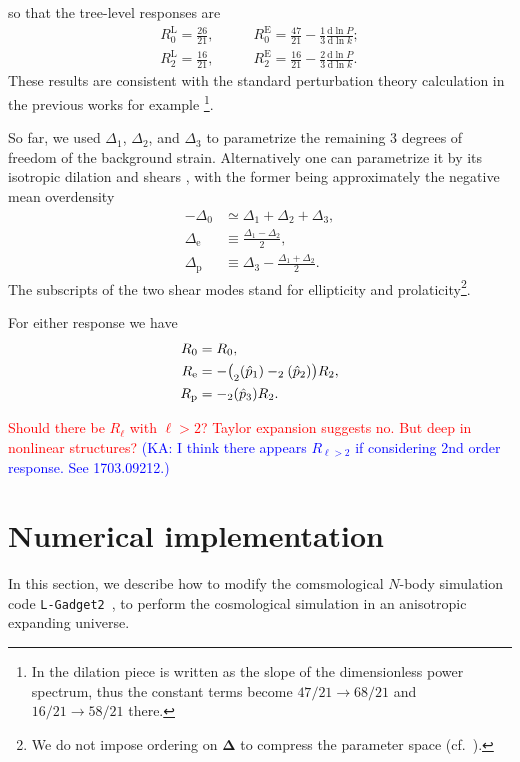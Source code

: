 \documentclass[a4paper,11pt]{article}
\let\L\relax
\DeclareMathOperator{\L}{\mathcal{L}}
\renewcommand{\d}{\mathrm{d}}
\newcommand{\vDelta}{{\bm\Delta}}
\newcommand{\Euler}{\mathrm{E}}
\newcommand{\Lagrange}{\mathrm{L}}
\newcommand{\HL}[1]{\textcolor{red}{#1}} %
\newcommand{\KA}[1]{\textcolor{Blue}{(KA: #1)}}
\begin{document}
so that the tree-level responses are
\begin{align}
    R^\Lagrange_0 = \frac{26}{21}, \qquad
    & R^\Euler_0 = \frac{47}{21} - \frac13 \frac{\d\ln P}{\d\ln k};
    \nonumber\\
    R^\Lagrange_2 = \frac{16}{21}, \qquad
    & R^\Euler_2 = \frac{16}{21} - \frac23 \frac{\d\ln P}{\d\ln k}.
\end{align}
These results are consistent with the standard perturbation theory calculation
in the previous works for example \cite{LiSchmittfullSeljak17}\footnote{In
\cite{LiSchmittfullSeljak17} the dilation piece is written as the slope of the
dimensionless power spectrum, thus the constant terms become $47/21 \to 68/21$
and $16/21 \to 58/21$ there.}.

So far, we used $\Delta_1$, $\Delta_2$, and $\Delta_3$ to parametrize the remaining 3 degrees of freedom of the
background strain.
Alternatively one can parametrize it
 by its isotropic dilation and shears \cite{BondMyers96I},
with the former being approximately the negative mean overdensity
\begin{align}
    -\Delta_0 &\simeq \Delta_1 + \Delta_2 + \Delta_3, \nonumber\\
    \Delta_\mathrm{e} &\equiv \frac{\Delta_1 - \Delta_2}2, \nonumber\\
    \Delta_\mathrm{p} &\equiv \Delta_3 - \frac{\Delta_1 + \Delta_2}2.
\end{align}
The subscripts of the two shear modes stand for ellipticity and
prolaticity\footnote{We do not impose ordering on $\vDelta$ to compress the
parameter space (cf.\ \cite{BondMyers96I}).}.

For either response we have
\begin{align}
    R_0 &= R_0, \nonumber\\
    R_\mathrm{e}
    &= - \bigl(\L_2(\hat p_1) - \L_2(\hat p_2)\bigr) R_2, \nonumber\\
    R_\mathrm{p} &= - \L_2(\hat p_3) R_2.
\end{align}

\HL{Should there be $R_\ell$ with $\ell>2$? Taylor expansion suggests
no. But deep in nonlinear structures?}
\KA{I think there appears $R_{\ell >2}$ if considering 2nd order response. See 1703.09212.}



\section{Numerical implementation}
\label{sec:num}
In this section, we describe how to modify
the comsmological $N$-body simulation code \texttt{L-Gadget2}~\cite{Springel:2005},
to perform the cosmological simulation in an anisotropic expanding universe.
\end{document}
